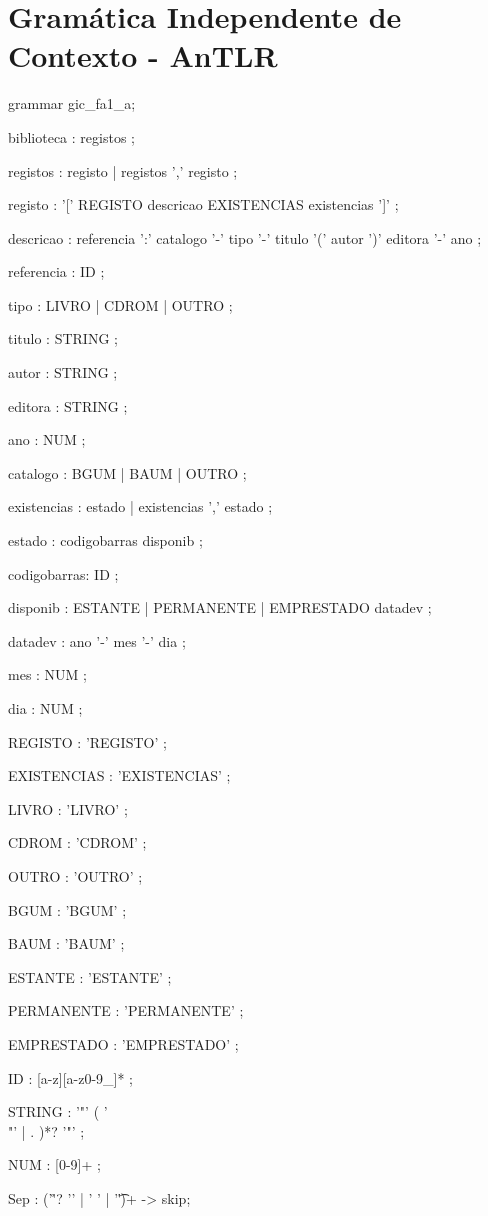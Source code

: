 \newpage
\appendix
\section{Gramática Independente de Contexto - AnTLR}
\begin{spverbatim}
grammar gic_fa1_a;

biblioteca : registos ;

registos    : registo
            | registos ',' registo
			      ;

registo     : '[' REGISTO descricao EXISTENCIAS existencias ']' ;

descricao   : referencia ':' catalogo '-' tipo '-' titulo '(' autor ')' editora '-' ano ;

referencia  : ID ;

tipo        : LIVRO
            | CDROM
            | OUTRO
            ;

titulo      : STRING ;

autor       : STRING ;

editora     : STRING ;

ano         : NUM ;

catalogo    : BGUM
            | BAUM
            | OUTRO
            ;

existencias : estado
            | existencias ',' estado
            ;

estado      : codigobarras disponib ;

codigobarras: ID ;

disponib    : ESTANTE
            | PERMANENTE
            | EMPRESTADO datadev
            ;

datadev     : ano '-' mes '-' dia ;

mes         : NUM ;

dia         : NUM ;

REGISTO     : 'REGISTO' ;

EXISTENCIAS : 'EXISTENCIAS' ;

LIVRO       : 'LIVRO' ;

CDROM       : 'CDROM' ;

OUTRO       : 'OUTRO' ;

BGUM        : 'BGUM' ;

BAUM        : 'BAUM' ;

ESTANTE     : 'ESTANTE' ;

PERMANENTE  : 'PERMANENTE' ;

EMPRESTADO  : 'EMPRESTADO' ;

ID          : [a-z][a-z0-9_]* ;

STRING      : '"' ( '\\"' | . )*? '"' ;

NUM         : [0-9]+ ;

Sep         :    ('\r'? '\n' | ' ' | '\t')+ -> skip;
\end{spverbatim}
\newpage
